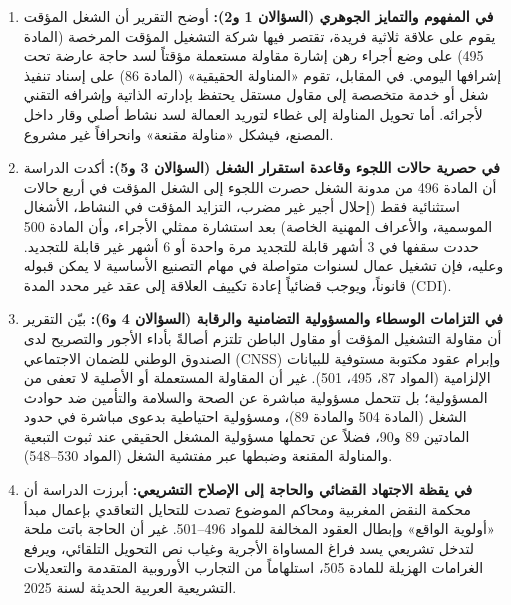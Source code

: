 \begin{enumerate}[leftmargin=*, itemsep=9pt]
    \item \textbf{في المفهوم والتمايز الجوهري (السؤالان \textenglish{1} و\textenglish{2}):}
          أوضح التقرير أن الشغل المؤقت يقوم على علاقة ثلاثية فريدة، تقتصر فيها شركة التشغيل المؤقت المرخصة (المادة \textenglish{495}) على وضع أجراء رهن إشارة مقاولة مستعملة مؤقتاً لسد حاجة عارضة تحت إشرافها اليومي. في المقابل، تقوم «المناولة الحقيقية» (المادة \textenglish{86}) على إسناد تنفيذ شغل أو خدمة متخصصة إلى مقاول مستقل يحتفظ بإدارته الذاتية وإشرافه التقني لأجرائه. أما تحويل المناولة إلى غطاء لتوريد العمالة لسد نشاط أصلي وقار داخل المصنع، فيشكل «مناولة مقنعة» وانحرافاً غير مشروع.

    \item \textbf{في حصرية حالات اللجوء وقاعدة استقرار الشغل (السؤالان \textenglish{3} و\textenglish{5}):}
          أكدت الدراسة أن المادة \textenglish{496} من مدونة الشغل حصرت اللجوء إلى الشغل المؤقت في أربع حالات استثنائية فقط (إحلال أجير غير مضرب، التزايد المؤقت في النشاط، الأشغال الموسمية، والأعراف المهنية الخاصة) بعد استشارة ممثلي الأجراء، وأن المادة \textenglish{500} حددت سقفها في \textenglish{3} أشهر قابلة للتجديد مرة واحدة أو \textenglish{6} أشهر غير قابلة للتجديد. وعليه، فإن تشغيل عمال لسنوات متواصلة في مهام التصنيع الأساسية لا يمكن قبوله قانوناً، ويوجب قضائياً إعادة تكييف العلاقة إلى عقد غير محدد المدة (\textenglish{CDI}).

    \item \textbf{في التزامات الوسطاء والمسؤولية التضامنية والرقابة (السؤالان \textenglish{4} و\textenglish{6}):}
          بيّن التقرير أن مقاولة التشغيل المؤقت أو مقاول الباطن تلتزم أصالةً بأداء الأجور والتصريح لدى الصندوق الوطني للضمان الاجتماعي (\textenglish{CNSS}) وإبرام عقود مكتوبة مستوفية للبيانات الإلزامية (المواد \textenglish{87}، \textenglish{495}، \textenglish{501}). غير أن المقاولة المستعملة أو الأصلية لا تعفى من المسؤولية؛ بل تتحمل مسؤولية مباشرة عن الصحة والسلامة والتأمين ضد حوادث الشغل (المادة \textenglish{504} والمادة \textenglish{89})، ومسؤولية احتياطية بدعوى مباشرة في حدود المادتين \textenglish{89} و\textenglish{90}، فضلاً عن تحملها مسؤولية المشغل الحقيقي عند ثبوت التبعية والمناولة المقنعة وضبطها عبر مفتشية الشغل (المواد \textenglish{530}--\textenglish{548}).

    \item \textbf{في يقظة الاجتهاد القضائي والحاجة إلى الإصلاح التشريعي:}
          أبرزت الدراسة أن محكمة النقض المغربية ومحاكم الموضوع تصدت للتحايل التعاقدي بإعمال مبدأ «أولوية الواقع» وإبطال العقود المخالفة للمواد \textenglish{496}--\textenglish{501}. غير أن الحاجة باتت ملحة لتدخل تشريعي يسد فراغ المساواة الأجرية وغياب نص التحويل التلقائي، ويرفع الغرامات الهزيلة للمادة \textenglish{505}، استلهاماً من التجارب الأوروبية المتقدمة والتعديلات التشريعية العربية الحديثة لسنة \textenglish{2025}.
\end{enumerate}

